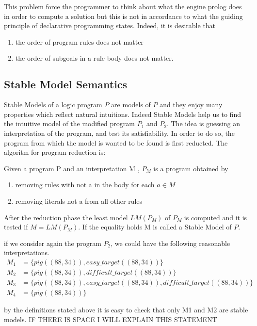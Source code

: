 This problem force the programmer to think about what the engine prolog does in order to compute a solution but this is not in accordance to what the guiding principle of declarative programming states.
Indeed, it is desirable that
\begin{enumerate}
\item the order of program rules does not matter
\item the order of subgoals in a rule body does not matter.
\end{enumerate}


\subsection{Stable Model Semantics}
Stable Models of a logic program \(P\) are models of \(P\) and they enjoy many properties which reflect natural intuitions. Indeed  Stable Models help us to find the intuitive model of the modified program \(P_1\) and \(P_2\). The idea is guessing an interpretation of the program, and test its satisfiability. In order to do so, the program from which the model is wanted to be found is first reducted. The algoritm for program reduction is:

Given a program P and an interpretation M , \(P_M\) is a program obtained by 
\begin{enumerate} 
\item removing rules with not a in the body for each \(a \in M\)
\item removing literals not a from all other rules
\end{enumerate}
After the reduction phase the least model \(LM(P_M)\) of \(P_M\) is computed and it is tested if \(M = LM(P_M)\). If the equality holds M is called a Stable Model of \(P\).

if we consider again the program \(P_2\), we could have the following reasonable interpretations.
\begin{align*}
M_1&= \{pig((88,34)), easy\_target((88,34))\}  \\
M_2&= \{pig((88,34)), difficult\_target((88,34))\} \\
M_3&= \{pig((88,34)), easy\_target((88,34)), difficult\_target((88,34))\} \\
M_4&= \{pig((88,34))\}
\end{align*}

by the definitions stated above it is easy to check that only M1 and M2 are stable models. IF THERE IS SPACE I WILL EXPLAIN THIS STATEMENT


